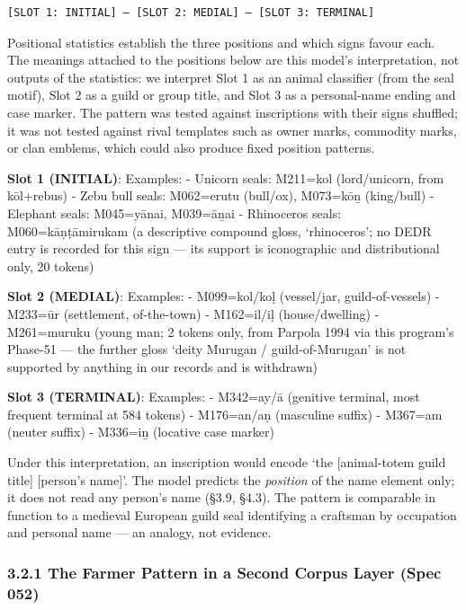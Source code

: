 \documentclass[
]{article}
\begin{document}
\begin{verbatim}
[SLOT 1: INITIAL] – [SLOT 2: MEDIAL] – [SLOT 3: TERMINAL]
\end{verbatim}

Positional statistics establish the three positions and which signs favour each. The meanings attached to the positions below are this model's interpretation, not outputs of the statistics: we interpret Slot 1 as an animal classifier (from the seal motif), Slot 2 as a guild or group title, and Slot 3 as a personal-name ending and case marker. The pattern was tested against inscriptions with their signs shuffled; it was not tested against rival templates such as owner marks, commodity marks, or clan emblems, which could also produce fixed position patterns.

\textbf{Slot 1 (INITIAL)}: Examples: - Unicorn seals: M211=kol (lord/unicorn, from
kōl+rebus) - Zebu bull seals: M062=erutu (bull/ox), M073=kōṉ (king/bull)
- Elephant seals: M045=yānai, M039=āṉai - Rhinoceros seals: M060=kāṇṭāmirukam (a descriptive compound gloss, `rhinoceros'; no DEDR entry is recorded for this sign --- its support is iconographic and distributional only, 20 tokens)

\textbf{Slot 2 (MEDIAL)}: Examples: - M099=kol/koḷ (vessel/jar,
guild-of-vessels) - M233=ūr (settlement, of-the-town) - M162=il/iḷ
(house/dwelling) - M261=muruku (young man; 2 tokens only, from Parpola 1994 via this program's Phase-51 --- the further gloss `deity Murugan / guild-of-Murugan' is not supported by anything in our records and is withdrawn)

\textbf{Slot 3 (TERMINAL)}: Examples: - M342=ay/ā (genitive terminal, most frequent terminal at 584
tokens) - M176=an/aṇ (masculine suffix) - M367=am (neuter suffix) -
M336=iṉ (locative case marker)

Under this interpretation, an inscription would encode `the [animal-totem guild title] [person's name]'. The model predicts the \emph{position} of the name element only; it does not read any person's name (§3.9, §4.3). The pattern is comparable in function to a medieval European guild seal identifying a craftsman by occupation and personal name --- an analogy, not evidence.

\subsubsection{3.2.1 The Farmer Pattern in a Second Corpus Layer
(Spec 052)}\label{the-farmer-pattern-in-a-second-corpus-layer-spec-052}
\end{document}
